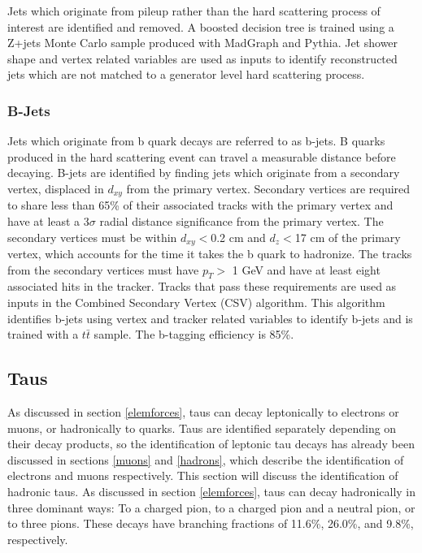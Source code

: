 \documentclass[oneside, letterpaper, oldfontcommands]{memoir}
\begin{document}
\qquad Jets which originate from pileup rather than the hard scattering process of interest are identified and removed. A boosted decision tree is trained using a Z+jets Monte Carlo sample produced with {\sc MadGraph} and {\sc Pythia}. Jet shower shape and vertex related variables are used as inputs to identify reconstructed jets which are not matched to a generator level hard scattering process\cite{CMS-PAS-JME-13-005}.

\subsubsection{B-Jets}\label{bjets}
\qquad Jets which originate from b quark decays are referred to as b-jets. B quarks produced in the hard scattering event can travel a measurable distance before decaying. B-jets are identified by finding jets which originate from a secondary vertex, displaced in $d_{xy}$ from the primary vertex. Secondary vertices are required to share less than 65\% of their associated tracks with the primary vertex and have at least a 3$\sigma$ radial distance significance from the primary vertex. The secondary vertices must be within $d_{xy} <$0.2 cm and $d_{z} <$17 cm of the primary vertex, which accounts for the time it takes the b quark to hadronize. The tracks from the secondary vertices must have $p_{T} >$ 1 GeV and have at least eight associated hits in the tracker. Tracks that pass these requirements are used as inputs in the Combined Secondary Vertex (CSV) algorithm. This algorithm identifies b-jets using vertex and tracker related variables to identify b-jets and is trained with a $t\bar{t}$ sample. The b-tagging efficiency is 85\%. \cite{Chatrchyan:2012jua}

\subsection{Taus}\label{taus}

\qquad As discussed in section \ref{elemforces}, taus can decay leptonically to electrons or muons, or hadronically to quarks. Taus are identified separately depending on their decay products, so the identification of leptonic tau decays has already been discussed in sections \ref{muons} and \ref{hadrons}, which describe the identification of electrons and muons respectively. This section will discuss the identification of hadronic taus. As discussed in section \ref{elemforces}, taus can decay hadronically in three dominant ways: To a charged pion, to a charged pion and a neutral pion, or to three pions. These decays have branching fractions of 11.6\%, 26.0\%, and 9.8\%, respectively.
\end{document}
